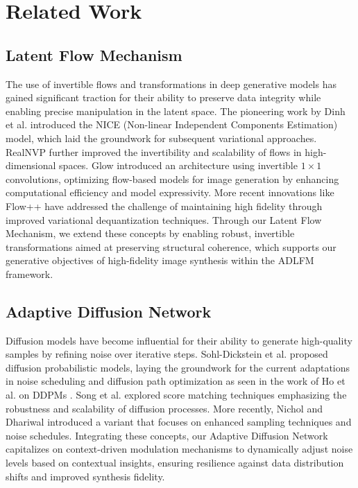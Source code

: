 \documentclass{article} %
\begin{document}
\section{Related Work}

\subsection{Latent Flow Mechanism}

The use of invertible flows and transformations in deep generative models has gained significant traction for their ability to preserve data integrity while enabling precise manipulation in the latent space. The pioneering work by Dinh et al. \citep{dinh2014nice} introduced the NICE (Non-linear Independent Components Estimation) model, which laid the groundwork for subsequent variational approaches. RealNVP \citep{dinh2016density} further improved the invertibility and scalability of flows in high-dimensional spaces. Glow \citep{kingma2018glow} introduced an architecture using invertible $1\times1$ convolutions, optimizing flow-based models for image generation by enhancing computational efficiency and model expressivity. More recent innovations like Flow++ \citep{ho2019flow++} have addressed the challenge of maintaining high fidelity through improved variational dequantization techniques. Through our Latent Flow Mechanism, we extend these concepts by enabling robust, invertible transformations aimed at preserving structural coherence, which supports our generative objectives of high-fidelity image synthesis within the ADLFM framework.

\subsection{Adaptive Diffusion Network}

Diffusion models have become influential for their ability to generate high-quality samples by refining noise over iterative steps. Sohl-Dickstein et al. \citep{sohl2015deep} proposed diffusion probabilistic models, laying the groundwork for the current adaptations in noise scheduling and diffusion path optimization as seen in the work of Ho et al. on DDPMs \citep{ho2020denoising}. Song et al. \citep{song2019generative} explored score matching techniques emphasizing the robustness and scalability of diffusion processes. More recently, Nichol and Dhariwal \citep{nichol2021improved} introduced a variant that focuses on enhanced sampling techniques and noise schedules. Integrating these concepts, our Adaptive Diffusion Network capitalizes on context-driven modulation mechanisms to dynamically adjust noise levels based on contextual insights, ensuring resilience against data distribution shifts and improved synthesis fidelity.
\end{document}
